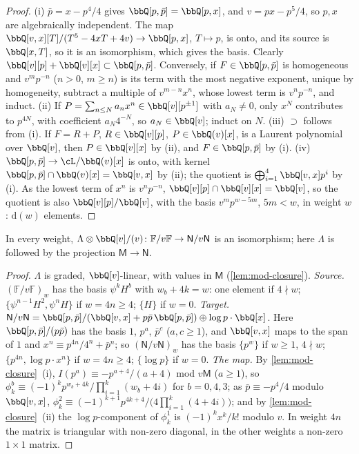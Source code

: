 \begin{proof}
(i) $\bar p=x-p^4/4$ gives $\bbQ[p,\bar p]=\bbQ[p,x]$, and $v=px-p^5/4$, so $p,x$ are algebraically independent. The map $\bbQ[v,x][T]/(T^5-4xT+4v)\to\bbQ[p,x]$, $T\mapsto p$, is onto, and its source is $\bbQ[x,T]$, so it is an isomorphism, which gives the basis. Clearly $\bbQ[v][p]+\bbQ[v][x]\subset\bbQ[p,\bar p]$. Conversely, if $F\in\bbQ[p,\bar p]$ is homogeneous and $v^mp^{-n}$ ($n>0$, $m\geq n$) is its term with the most negative exponent, unique by homogeneity, subtract a multiple of $v^{m-n}x^n$, whose lowest term is $v^np^{-n}$, and induct. (ii) If $P=\sum_{n\leq N}a_nx^n\in\bbQ[v][p^{\pm1}]$ with $a_N\neq 0$, only $x^N$ contributes to $p^{4N}$, with coefficient $a_N4^{-N}$, so $a_N\in\bbQ[v]$; induct on $N$. (iii) $\supset$ follows from (i). If $F=R+P$, $R\in\bbQ[v][p]$, $P\in\bbQ(v)[x]$, is a Laurent polynomial over $\bbQ[v]$, then $P\in\bbQ[v][x]$ by (ii), and $F\in\bbQ[p,\bar p]$ by (i). (iv) $\bbQ[p,\bar p]\to\cL/\bbQ(v)[x]$ is onto, with kernel $\bbQ[p,\bar p]\cap\bbQ(v)[x]=\bbQ[v,x]$ by (ii); the quotient is $\bigoplus_{i=1}^4\bbQ[v,x]p^i$ by (i). As the lowest term of $x^n$ is $v^np^{-n}$, $\bbQ[v][p]\cap\bbQ[v][x]=\bbQ[v]$, so the quotient is also $\bbQ[v][p]/\bbQ[v]$, with the basis $v^mp^{w-5m}$, $5m<w$, in weight $w$: $\mathrm d(w)$ elements.
\end{proof}

\begin{lem}
\label{lem:mod-modv}
In every weight, $\Lambda\otimes\bbQ[v]/(v)\colon\mathbb F/v\mathbb F\to\mathsf N/v\mathsf N$ is an isomorphism; here $\Lambda$ is followed by the projection $\mathsf M\to\mathsf N$.
\end{lem}

\begin{proof}
$\Lambda$ is graded, $\bbQ[v]$-linear, with values in $\mathsf M$ (\cref{lem:mod-closure}). \emph{Source.} $(\mathbb F/v\mathbb F)_w$ has the basis $\psi^kH^b$ with $w_b+4k=w$: one element if $4\nmid w$; $\{\psi^{n-1}H^2,\psi^nH\}$ if $w=4n\geq 4$; $\{H\}$ if $w=0$. \emph{Target.} $\mathsf N/v\mathsf N=\bbQ[p,\bar p]/(\bbQ[v,x]+p\bar p\,\bbQ[p,\bar p])\oplus\log p\cdot\bbQ[x]$. Here $\bbQ[p,\bar p]/(p\bar p)$ has the basis $1$, $p^a$, $\bar p^c$ ($a,c\geq 1$), and $\bbQ[v,x]$ maps to the span of $1$ and $x^n\equiv p^{4n}/4^n+\bar p^n$; so $(\mathsf N/v\mathsf N)_w$ has the basis $\{p^w\}$ if $w\geq 1$, $4\nmid w$; $\{p^{4n},\log p\cdot x^n\}$ if $w=4n\geq 4$; $\{\log p\}$ if $w=0$. \emph{The map.} By \cref{lem:mod-closure}~(i), $I(p^a)\equiv -p^{a+4}/(a+4)$ mod $v\mathsf M$ ($a\geq 1$), so $\phi^b_k\equiv(-1)^kp^{w_b+4k}/\prod_{i=1}^k(w_b+4i)$ for $b=0,4,3$; as $\bar p\equiv -p^4/4$ modulo $\bbQ[v,x]$, $\phi^2_k\equiv(-1)^{k+1}p^{4k+4}/\big(4\prod_{i=1}^k(4+4i)\big)$; and by \cref{lem:mod-closure}~(ii) the $\log p$-component of $\phi^1_k$ is $(-1)^kx^k/k!$ modulo $v$. In weight $4n$ the matrix is triangular with non-zero diagonal, in the other weights a non-zero $1\times 1$ matrix.
\end{proof}

